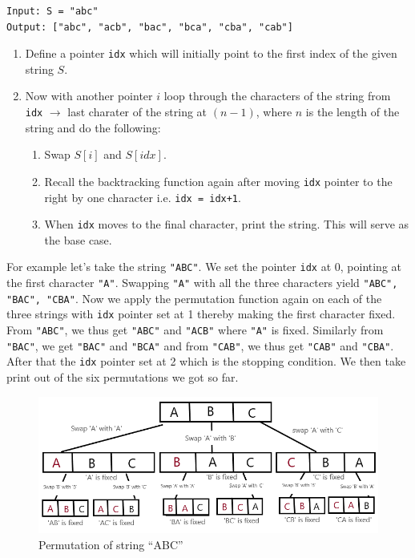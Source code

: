 \documentclass[a4paper,11pt]{book}
\begin{document}
\begin{lstlisting}
Input: S = "abc"
Output: ["abc", "acb", "bac", "bca", "cba", "cab"]
\end{lstlisting}

\begin{enumerate}
\item Define a pointer \lstinline{idx} which will initially point to the first index of the given string $S$.
\item Now with another pointer $i$ loop through the characters of the string from \lstinline{idx} $\rightarrow$ last charater of the string at $(n-1)$, where $n$ is the length of the string and do the following:
\begin{enumerate}
    \item Swap $S[i]$ and $S[idx]$.
    \item Recall the backtracking function again after moving \lstinline{idx} pointer to the right by one character i.e. \lstinline{idx = idx+1}.
\item When \lstinline{idx} moves to the final character, print the string. This will serve as the base case.
\end{enumerate}
\end{enumerate}

\noindent For example let's take the string \lstinline{"ABC"}. We set the pointer \lstinline{idx} at 0, pointing at the first character \lstinline{"A"}. Swapping \lstinline{"A"} with all the three characters yield \lstinline{"ABC", "BAC", "CBA"}. Now we apply the permutation function again on each of the three strings with \lstinline{idx} pointer set at 1 thereby making the first character fixed. From \lstinline{"ABC"}, we thus get \lstinline{"ABC"} and \lstinline{"ACB"} where \lstinline{"A"} is fixed. Similarly from \lstinline{"BAC"}, we get \lstinline{"BAC"} and \lstinline{"BCA"} and from \lstinline{"CAB"}, we thus get \lstinline{"CAB"} and \lstinline{"CBA"}. After that the \lstinline{idx} pointer set at 2 which is the stopping condition. We then take print out of the six permutations we got so far.
\begin{figure}[ht]
	\centering
	\includegraphics[scale=0.45]{code/sort/pic/recursiontreeabc.png}
	\caption{Permutation of string ``ABC''}
\end{figure}
\vspace{5mm}
\end{document}
